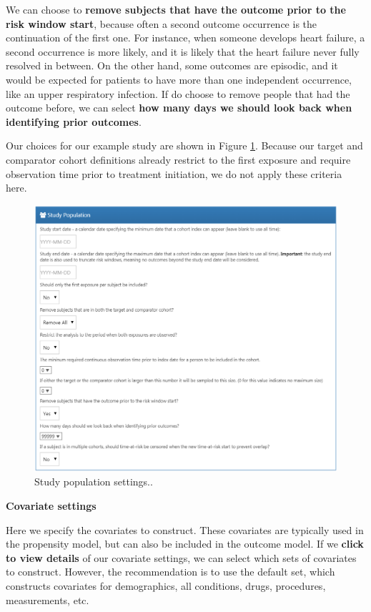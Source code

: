 \documentclass[11pt]{book}
\begin{document}
We can choose to \textbf{remove subjects that have the outcome prior to
the risk window start}, because often a second outcome occurrence is the
continuation of the first one. For instance, when someone develops heart
failure, a second occurrence is more likely, and it is likely that the
heart failure never fully resolved in between. On the other hand, some
outcomes are episodic, and it would be expected for patients to have
more than one independent occurrence, like an upper respiratory
infection. If do choose to remove people that had the outcome before, we
can select \textbf{how many days we should look back when identifying
prior outcomes}.

Our choices for our example study are shown in Figure
\ref{fig:studyPopulation}. Because our target and comparator cohort
definitions already restrict to the first exposure and require
observation time prior to treatment initiation, we do not apply these
criteria here.

\begin{figure}

{\centering \includegraphics[width=1\linewidth]{images/PopulationLevelEstimation/studyPopulation} 

}

\caption{Study population settings..}\label{fig:studyPopulation}
\end{figure}

\textbf{Covariate settings}

Here we specify the covariates to construct. These covariates are
typically used in the propensity model, but can also be included in the
outcome model. If we \textbf{click to view details} of our covariate
settings, we can select which sets of covariates to construct. However,
the recommendation is to use the default set, which constructs
covariates for demographics, all conditions, drugs, procedures,
measurements, etc.
\end{document}
